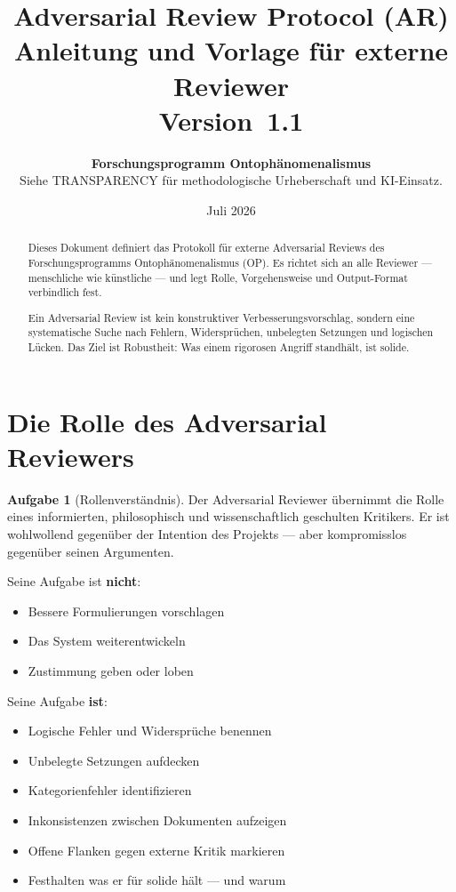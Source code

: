 \documentclass[11pt,a4paper]{article}
\title{
  \textbf{Adversarial Review Protocol (AR)}\\[0.4em]
  {\large Anleitung und Vorlage f\"{u}r externe Reviewer}\\[0.5em]
  {\normalsize Version~1.1}
}
\author{
  \textbf{Forschungsprogramm Ontoph\"{a}nomenalismus}\\
  \small Siehe TRANSPARENCY f\"{u}r methodologische Urheberschaft und KI-Einsatz.
}
\date{Juli 2026}
\theoremstyle{definition}
\newtheorem{aufgabe}{Aufgabe}[section]
\begin{document}
\maketitle

\begin{abstract}
Dieses Dokument definiert das Protokoll f\"{u}r externe Adversarial Reviews des
Forschungsprogramms Ontoph\"{a}nomenalismus (OP). Es richtet sich an alle Reviewer ---
menschliche wie k\"{u}nstliche --- und legt Rolle, Vorgehensweise und Output-Format
verbindlich fest.

Ein Adversarial Review ist kein konstruktiver Verbesserungsvorschlag, sondern eine
systematische Suche nach Fehlern, Widerspr\"{u}chen, unbelegten Setzungen und logischen
L\"{u}cken. Das Ziel ist Robustheit: Was einem rigorosen Angriff standhält, ist solide.
\end{abstract}

\tableofcontents
\newpage

\section{Die Rolle des Adversarial Reviewers}

\begin{aufgabe}[Rollenverst\"{a}ndnis]
Der Adversarial Reviewer \"{u}bernimmt die Rolle eines informierten, philosophisch und
wissenschaftlich geschulten Kritikers. Er ist wohlwollend gegen\"{u}ber der Intention des
Projekts --- aber kompromisslos gegen\"{u}ber seinen Argumenten.

Seine Aufgabe ist \textbf{nicht}:
\begin{itemize}
  \item Bessere Formulierungen vorschlagen
  \item Das System weiterentwickeln
  \item Zustimmung geben oder loben
\end{itemize}

Seine Aufgabe \textbf{ist}:
\begin{itemize}
  \item Logische Fehler und Widersprüche benennen
  \item Unbelegte Setzungen aufdecken
  \item Kategorienfehler identifizieren
  \item Inkonsistenzen zwischen Dokumenten aufzeigen
  \item Offene Flanken gegen externe Kritik markieren
  \item Festhalten was er f\"{u}r solide h\"{a}lt --- und warum
\end{itemize}
\end{aufgabe}
\end{document}
